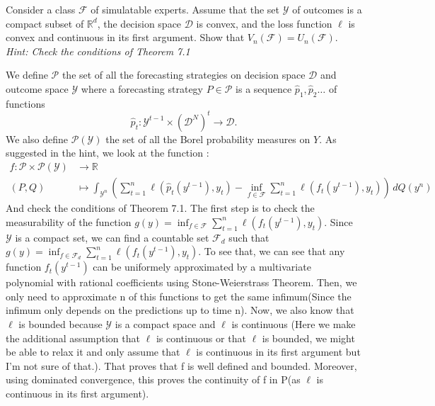 \begin{exercise}[]{}
	Consider a class $ \mathcal{F} $ of simulatable experts. Assume that the set $ \mathcal{Y} $ of outcomes is a compact subset of $ \mathbb{R}^d $, the decision space $  \mathcal{D} $ is convex, and the loss function $ \ell $ is convex and continuous in its first argument. Show that $ V_n(\mathcal{F}) = U_n(\mathcal{F}) $. \it{Hint:} Check the conditions of Theorem 7.1
\end{exercise}

\begin{solution}[]
	We define $ \mathcal{P} $ the set of all the forecasting strategies on decision space $ \mathcal{D} $ and outcome space $ \mathcal{Y} $ where a forecasting strategy $ P\in \mathcal{P} $ is a sequence $ \hat{p}_1,\hat{p}_2\ldots $ of functions
\begin{equation*}
		\hat{p}_t: \mathcal{Y}^{t-1}\times (\mathcal{D}^{N})^{t}\rightarrow \mathcal{D} .
\end{equation*}
We also define $ \mathcal{P}(\mathcal{Y}) $ the set of all the Borel probability measures on $ Y $.
	As suggested in the hint, we look at the function :
\begin{align*}
f: \mathcal{P}\times \mathcal{P}(\mathcal{Y})& \longrightarrow \mathbb{R} \\
(P,Q)&\longmapsto \int_{\mathcal{Y}^{n}}\left( \sum_{t=1}^{n}\ell(\hat{p}_t(y^{t-1}),y_t) - \inf_{f\in \mathcal{F}}\sum_{t=1}^{n}\ell(f_t(y^{t-1}),y_t) \right) \,dQ(y^{n}) 
\end{align*}
And check the conditions of Theorem 7.1. The first step is to check the measurability of the function $ g(y) =  \inf_{f\in \mathcal{F}}\sum_{t=1}^{n}\ell(f_t(y^{t-1}),y_t)$. Since $ \mathcal{Y} $ is a compact set, we can find a countable set $ \mathcal{F}_d $ such that $ g(y) =\inf_{f\in \mathcal{F}_d}\sum_{t=1}^{n}\ell(f_t(y^{t-1}),y_t) $. To see that, we can see that any function $ f_t(y^{t-1}) $ can be uniformely approximated by a multivariate polynomial with rational coefficients using Stone-Weierstrass Theorem. Then, we only need to approximate n of this functions to get the same infimum(Since the infimum only depends on the predictions up to time n). Now, we also know that $ \ell $ is bounded because $ \mathcal{Y} $ is a compact space and $ \ell $ is continuous (Here we make the additional assumption that $ \ell $ is continuous or that $ \ell $ is bounded, we might be able to relax it and only assume that $ \ell $ is continuous in its first argument but I'm not sure of that.). That proves that f is well defined and bounded. Moreover, using dominated convergence, this proves the continuity of f in P(as $ \ell $ is continuous in its first argument).

\end{solution}
